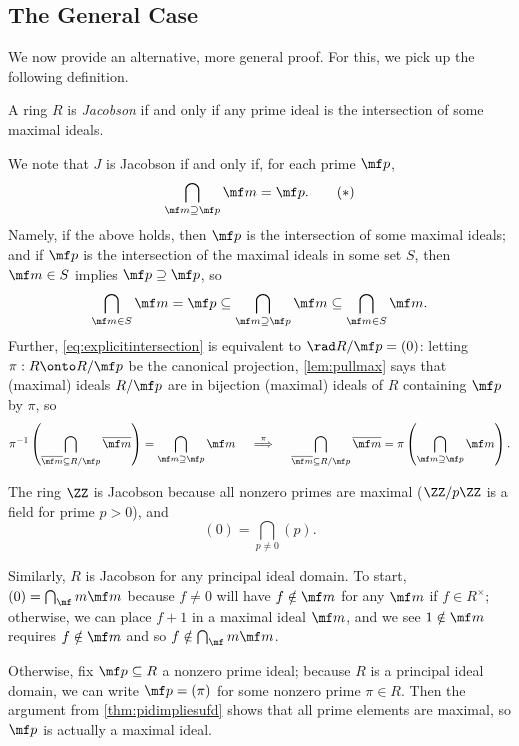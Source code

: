 \subsection{The General Case}
We now provide an alternative, more general proof. For this, we pick up the following definition.
\begin{definition}[Jacobson]
	A ring $R$ is \textit{Jacobson} if and only if any prime ideal is the intersection of some maximal ideals.
\end{definition}
\begin{remark}[Nir] \label{rem:jacobsonviarad}
	We note that $J$ is Jacobson if and only if, for each prime $\mf p$,
	\[\bigcap_{\mf m\supseteq\mf p}\mf m=\mf p.\tag{$*$}\label{eq:explicitintersection}\]
	Namely, if the above holds, then $\mf p$ is the intersection of some maximal ideals; and if $\mf p$ is the intersection of the maximal ideals in some set $S$, then $\mf m\in S$ implies $\mf p\supseteq\mf p$, so
	\[\bigcap_{\mf m\in S}\mf m=\mf p\subseteq\bigcap_{\mf m\supseteq\mf p}\mf m\subseteq\bigcap_{\mf m\in S}\mf m.\]
	Further, \autoref{eq:explicitintersection} is equivalent to $\rad R/\mf p=(0)$: letting $\pi:R\onto R/\mf p$ be the canonical projection, \autoref{lem:pullmax} says that (maximal) ideals $R/\mf p$ are in bijection (maximal) ideals of $R$ containing $\mf p$ by $\pi$, so
	\[\pi^{-1}\left(\bigcap_{\overline{\mf m}\subseteq R/\mf p}\overline{\mf m}\right)=\bigcap_{\mf m\supseteq\mf p}\mf m\quad\stackrel\pi\implies\quad\bigcap_{\overline{\mf m}\subseteq R/\mf p}\overline{\mf m}=\pi\left(\bigcap_{\mf m\supseteq\mf p}\mf m\right).\]
\end{remark}
\begin{example}
	The ring $\ZZ$ is Jacobson because all nonzero primes are maximal ($\ZZ/p\ZZ$ is a field for prime $p>0$), and
	\[(0)=\bigcap_{p\ne0}(p).\]
\end{example}
\begin{example} \label{ex:pidisjacobson}
	Similarly, $R$ is Jacobson for any principal ideal domain. To start, $(0)=\bigcap_\mf m\mf m$ because $f\ne0$ will have $f\notin\mf m$ for any $\mf m$ if $f\in R^\times$; otherwise, we can place $f+1$ in a maximal ideal $\mf m$, and we see $1\notin\mf m$ requires $f\notin\mf m$ and so $f\notin\bigcap_\mf m\mf m$.

	Otherwise, fix $\mf p\subseteq R$ a nonzero prime ideal; because $R$ is a principal ideal domain, we can write $\mf p=(\pi)$ for some nonzero prime $\pi\in R$. Then the argument from \autoref{thm:pidimpliesufd} shows that all prime elements are maximal, so $\mf p$ is actually a maximal ideal.
\end{example}
